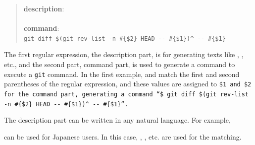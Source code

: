 \documentclass{sigchi}
\def\GIT{\texttt{git}}
\begin{document}
\begin{quote}
  \textbf{description}: \\
  \\
  \textbf{command}: \\
  {\fontsize{9pt}{0pt}\selectfont\verb|git diff $(git rev-list -n #{$2} HEAD -- #{$1})^ -- #{$1}|}
\end{quote}

The first regular expression, the description part,
is for generating texts like
, 
, etc.,
and the second part, command part,
is used to generate a command to execute a {\GIT} command.
In the first example,  and 
match the first and second parentheses of the regular expression, and
these values are assigned to \tt{\$1} and \tt{\$2}
for the command part, generating a command
``{\fontsize{9pt}{0pt}\selectfont\verb|$ git diff $(git rev-list -n #{$2} HEAD -- #{$1})^ -- #{$1}|}''.

The description part can be written in any natural language.
For example,

\begin{quote}
\end{quote}
  
can be used for Japanese users.
In this case,
,
, etc.
are used for the matching.

% 
%
\end{document}
